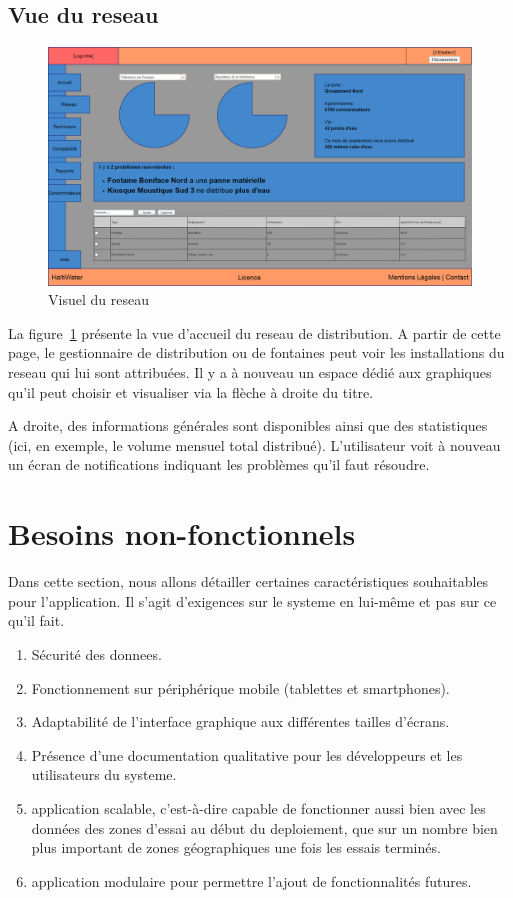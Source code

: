 \documentclass[a4paper, 11pt]{article}
\begin{document}
  \subsection{Vue du \gls{reseau}}
    \begin{figure}[H]
        \centering
        \includegraphics[width=.8\textwidth]{Cahier_des_Charges/reseau}
        \caption{Visuel du \gls{reseau}}
        \label{fig:network}
    \end{figure}
    La figure~\ref{fig:network} présente la vue d'accueil du \gls{reseau} de distribution. A partir de cette page, le gestionnaire de distribution ou de \glspl{fontaine} peut voir les installations du \gls{reseau} qui lui sont attribuées. Il y a à nouveau un espace dédié aux graphiques qu'il peut choisir et visualiser via la flèche à droite du titre.

    A droite, des informations générales sont disponibles ainsi que des statistiques (ici, en exemple, le volume mensuel total distribué).
    L'\gls{utilisateur} voit à nouveau un écran de notifications indiquant les problèmes qu'il faut résoudre.

\section{Besoins non-fonctionnels}
Dans cette section, nous allons détailler certaines caractéristiques souhaitables pour l'\gls{application}. Il s'agit d'exigences sur le \gls{systeme} en lui-même et pas sur ce qu'il fait.
\begin{enumerate}
  \item Sécurité des \glspl{donnee}.
  \item Fonctionnement sur périphérique mobile (tablettes et smartphones).
  \item Adaptabilité de l'interface graphique aux différentes tailles d'écrans.
  \item Présence d'une documentation qualitative pour les développeurs et les \glspl{utilisateur} du \gls{systeme}.
  \item \gls{application} \gls{scalable}, c'est-à-dire capable de fonctionner aussi bien avec les données des zones d'essai au début du \gls{deploiement}, que sur un nombre bien plus important de zones géographiques une fois les essais terminés.
  \item \gls{application} \gls{modulaire} pour permettre l'ajout de fonctionnalités futures.
\end{enumerate}
\end{document}
